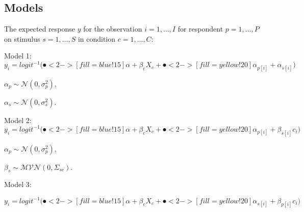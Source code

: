 \documentclass[compress]{beamer}
\begin{document}
\subsection{Models}

\begin{frame}
	\begin{footnotesize}
		The expected response $y$ for the observation $i = 1, \ldots, I$ for respondent $p = 1,\ldots, P$ on stimulus $s = 1,\ldots, S$ in condition $c= 1,\ldots, C$:
	\end{footnotesize}
	\footnotesize
	
	
	\vspace{3mm}
	Model 1:
	\begin{equation*}\label{AccuracyMin}
		y_{i} = logit^{-1}(\spot<2->[fill =blue!15]{\alpha + \beta_c X_c}  + \spot<2->[fill=yellow!20]{\alpha_{p[i]} +  \alpha_{s[i]})}
	\end{equation*}
	\begin{centering}
		
		$\alpha_p \sim \mathcal{N}(0, \sigma_p^2)$,
		
	\end{centering}
	
	\begin{centering}
		
		$\alpha_s \sim \mathcal{N}(0, \sigma_s^2)$.
		
	\end{centering}
	
	
	
	Model 2: 
	\begin{equation*}\label{Accuracy5}
		y_{i} = logit^{-1}(\spot<2->[fill =blue!15]{\alpha + \beta_c X_c}  + \spot<2->[fill=yellow!20]{ \alpha_{p[i]} +  \beta_{s[i]}c_{i})}
	\end{equation*}
	
	\begin{centering}
		$\alpha_p \sim \mathcal{N}(0, \sigma_p^2)$,
		
	\end{centering}
	
	\begin{centering}
		
		$\beta_s \sim \mathcal{MVN}(0, \Sigma_{sc})$.
		
	\end{centering}
	
	Model 3: 
	
	\begin{equation*}
		y_{i} = logit^{-1}(\spot<2->[fill =blue!15]{\alpha + \beta_c X_c}  + \spot<2->[fill=yellow!20]{\alpha_{s[i]} +  \beta_{p[i]}c_{i})}
	\end{equation*}
	

\end{frame}
\end{document}
